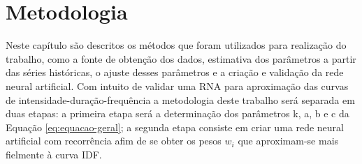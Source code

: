 \chapter{Metodologia}

Neste capítulo são descritos os métodos que foram utilizados para realização do trabalho, como a fonte de obtenção dos dados, estimativa dos parâmetros a partir das séries históricas, o ajuste desses parâmetros e a criação e validação da rede neural artificial.
Com intuito de validar uma RNA para aproximação das curvas de intensidade-duração-frequência a metodologia deste trabalho será separada em duas etapas: a primeira etapa será a determinação dos parâmetros k, a, b e c da Equação \ref{eq:equacao-geral}; a segunda etapa consiste em criar uma rede neural artificial com recorrência afim de se obter os pesos $w_i$ que aproximam-se mais fielmente à curva IDF.







